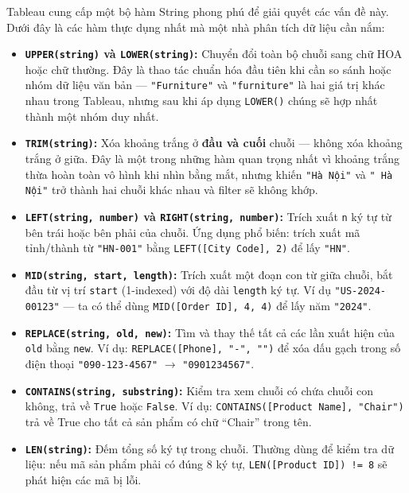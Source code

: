 \documentclass[12pt]{article}
\begin{document}
\noindent Tableau cung cấp một bộ hàm String phong phú để giải quyết các vấn đề này. Dưới đây là các hàm thực dụng nhất mà một nhà phân tích dữ liệu cần nắm:

\begin{itemize}
    \item \textbf{\texttt{UPPER(string)} và \texttt{LOWER(string)}:} Chuyển đổi toàn bộ chuỗi sang chữ HOA hoặc chữ thường. Đây là thao tác chuẩn hóa đầu tiên khi cần so sánh hoặc nhóm dữ liệu văn bản --- \texttt{"Furniture"} và \texttt{"furniture"} là hai giá trị khác nhau trong Tableau, nhưng sau khi áp dụng \texttt{LOWER()} chúng sẽ hợp nhất thành một nhóm duy nhất.

    \item \textbf{\texttt{TRIM(string)}:} Xóa khoảng trắng ở \textbf{đầu và cuối} chuỗi --- không xóa khoảng trắng ở giữa. Đây là một trong những hàm quan trọng nhất vì khoảng trắng thừa hoàn toàn vô hình khi nhìn bằng mắt, nhưng khiến \texttt{"Hà Nội"} và \texttt{" Hà Nội"} trở thành hai chuỗi khác nhau và filter sẽ không khớp.

    \item \textbf{\texttt{LEFT(string, number)} và \texttt{RIGHT(string, number)}:} Trích xuất \texttt{n} ký tự từ bên trái hoặc bên phải của chuỗi. Ứng dụng phổ biến: trích xuất mã tỉnh/thành từ \texttt{"HN-001"} bằng \texttt{LEFT([City Code], 2)} để lấy \texttt{"HN"}.

    \item \textbf{\texttt{MID(string, start, length)}:} Trích xuất một đoạn con từ giữa chuỗi, bắt đầu từ vị trí \texttt{start} (1-indexed) với độ dài \texttt{length} ký tự. Ví dụ \texttt{"US-2024-00123"} --- ta có thể dùng \texttt{MID([Order ID], 4, 4)} để lấy năm \texttt{"2024"}.

    \item \textbf{\texttt{REPLACE(string, old, new)}:} Tìm và thay thế tất cả các lần xuất hiện của \texttt{old} bằng \texttt{new}. Ví dụ: \texttt{REPLACE([Phone], "-", "")} để xóa dấu gạch trong số điện thoại \texttt{"090-123-4567"} $\rightarrow$ \texttt{"0901234567"}.

    \item \textbf{\texttt{CONTAINS(string, substring)}:} Kiểm tra xem chuỗi có chứa chuỗi con không, trả về \texttt{True} hoặc \texttt{False}. Ví dụ: \texttt{CONTAINS([Product Name], "Chair")} trả về True cho tất cả sản phẩm có chữ ``Chair'' trong tên.

    \item \textbf{\texttt{LEN(string)}:} Đếm tổng số ký tự trong chuỗi. Thường dùng để kiểm tra dữ liệu: nếu mã sản phẩm phải có đúng 8 ký tự, \texttt{LEN([Product ID]) != 8} sẽ phát hiện các mã bị lỗi.


\end{itemize}
\end{document}
